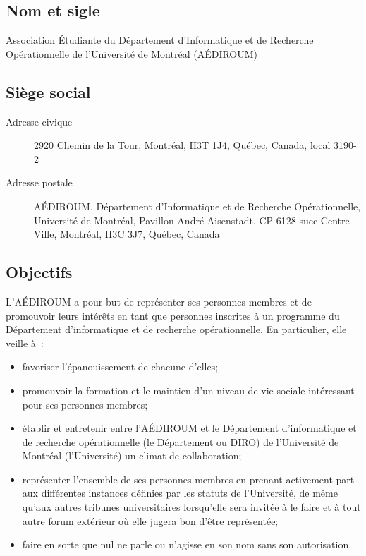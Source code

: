 \documentclass{aediroum}
\begin{document}
\subsection{Nom et sigle}\label{sec:nom-et-sigle}

Association Étudiante du Département d'Informatique et de Recherche Opérationnelle de l'Université de Montréal (AÉDIROUM)

\subsection{Siège social}\label{sec:siege-social}

\begin{description}
    \item[Adresse civique] 2920 Chemin de la Tour, Montréal, H3T 1J4, Québec, Canada, local 3190-2
    \item[Adresse postale] AÉDIROUM, Département d'Informatique et de Recherche Opérationnelle, Université de Montréal, Pavillon André-Aisenstadt, CP 6128 succ Centre-Ville, Montréal, H3C 3J7, Québec, Canada
\end{description}

\subsection{Objectifs}\label{sec:objectifs}

L'AÉDIROUM a pour but de représenter ses personnes membres et de promouvoir leurs intérêts en tant que personnes inscrites à un programme du Département d'informatique et de recherche opérationnelle. En particulier, elle veille à~:

\begin{itemize}
    \item favoriser l'épanouissement de chacune d'elles;
    \item promouvoir la formation et le maintien d'un niveau de vie sociale intéressant pour ses personnes membres;
    \item établir et entretenir entre l'AÉDIROUM et le Département d'informatique et de recherche opérationnelle (le Département ou DIRO) de l'Université de Montréal (l'Université) un climat de collaboration;
    \item représenter l'ensemble de ses personnes membres en prenant activement part aux différentes instances définies par les statuts de l'Université, de même qu'aux autres tribunes universitaires lorsqu'elle sera invitée à le faire et à tout autre forum extérieur où elle jugera bon d'être représentée;
    \item faire en sorte que nul ne parle ou n'agisse en son nom sans son autorisation.
\end{itemize}
\end{document}
